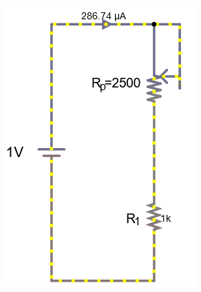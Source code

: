 \documentclass[a4paper]{article}
\begin{document}
\begin{figure}[H]
\begin{subfigure}{0.333\textwidth}
        \includegraphics[width=.9\linewidth]{amp1}
    \end{subfigure}
    \begin{subfigure}{0.333\textwidth}

\end{subfigure}
\end{figure}
\end{document}

